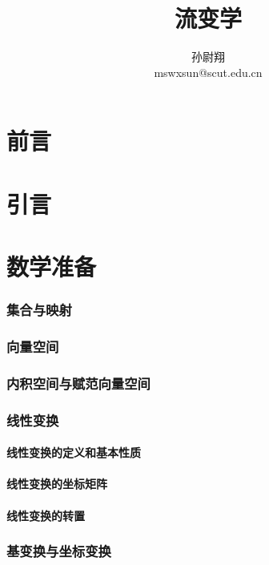 \documentclass[zihao=-4,linespread=1.5,heading=true,a4paper,twoside]{ctexart}
\title{流变学}
\author{孙尉翔\\mswxsun@scut.edu.cn}
\begin{document}
\part*{前言}\label{sec:preface}


\newpage\tableofcontents

\newpage\part{引言}

\newpage\part{数学准备}
\section{集合与映射}\label{sec:II.1}


\section{向量空间}\label{sec:II.2}


\section{内积空间与赋范向量空间}\label{sec:II.3}


\section{线性变换}\label{sec:II.4}
\subsection{线性变换的定义和基本性质}\label{sec:II.4.1}


\subsection{线性变换的坐标矩阵}\label{sec:II.4.2}


\subsection{线性变换的转置}\label{sec:II.4.3}


\section{基变换与坐标变换}\label{sec:II.5}

\end{document}
